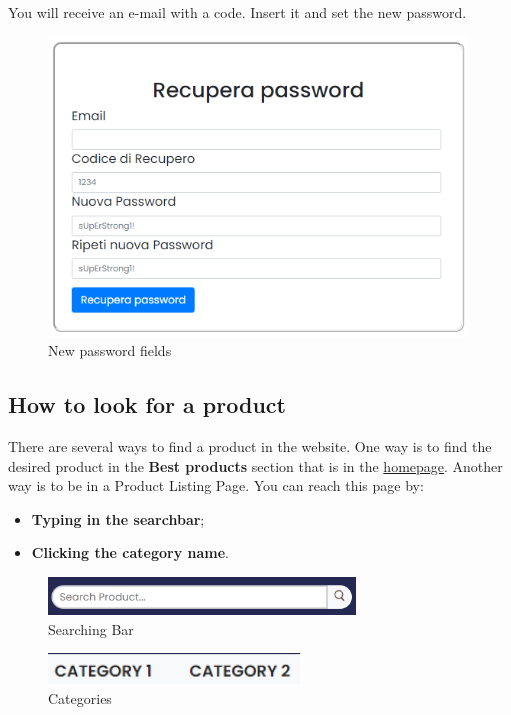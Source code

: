 You will receive an e-mail with a code. Insert it and set the new password.
\begin{figure}[H]
    \centering
    \includegraphics[width=30em]{res/images/cliente/newpassword.png}
    \caption{New password fields}
\end{figure}


\subsection{How to look for a product} \label{_lookforproduct}
There are several ways to find a product in the website. One way is to find the desired product in the \textbf{Best products} section that is in the \hyperref[_homepage]{homepage}. Another way is to be in a Product Listing Page. You can reach this page by:
\begin{itemize} 
    \item \textbf{Typing in the searchbar};
    \item \textbf{Clicking the category name}.
\end{itemize}

\begin{figure}[H]
    \centering
    \includegraphics[width=22em]{res/images/cliente/searchingbar.png}
    \caption{Searching Bar}
\end{figure}

\begin{figure}[H]
    \centering
    \includegraphics[width=18em]{res/images/cliente/categories.png}
    \caption{Categories}
\end{figure}

